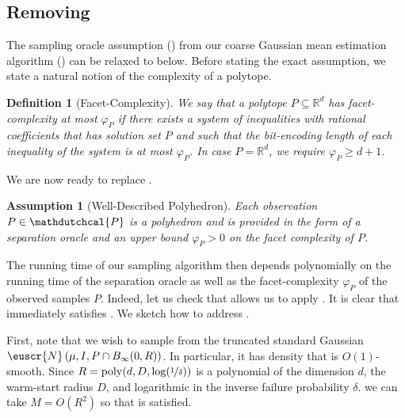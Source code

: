 \documentclass[11pt,letterpaper]{article}
\newcommand{\sset}{\subseteq}
\theoremstyle{plain}
\newtheorem{assumption}{Assumption}
\newtheorem{definition}{Definition}
\theoremstyle{definition}
\theoremstyle{remark}
\newcommand{\inparen}[1]{\ensuremath{\left(#1\right)}}
\newcommand{\R}{\mathbb{R}}
\newcommand{\nfrac}[2]{\nicefrac{#1}{#2}}
\newcommand{\poly}{\mathrm{poly}}
\newcommand{\customcal}[1]{\euscr{#1}}
\newcommand{\cN}{\customcal{N}}
\newcommand{\hypo}[1]{\mathdutchcal{#1}}
\newcommand{\hyP}{\hypo{P}}
\newcommand{\truncatedNormal}[3]{\cN\inparen{#1,#2,#3}}
\begin{document}
{{{    \subsection{Removing \texorpdfstring{}{Assumption}} \label{apx:sampling-polytopes:removing-oracle-assumption}
    The sampling oracle assumption () from our coarse Gaussian mean estimation algorithm () can be relaxed to  below.
    Before stating the exact assumption,
    we state a natural notion of the complexity of a polytope.
    \begin{definition}[Facet-Complexity]
        We say that a polytope $P\sset \R^d$ has \emph{facet-complexity} at most $\varphi_P$
        if there exists a system of inequalities with rational coefficients that has solution set $P$ and such that the bit-encoding length of each inequality of the system is at most $\varphi_P$.
        In case $P=\R^d$,
        we require $\varphi_P\geq d+1$.
    \end{definition}
    We are now ready to replace .
    \begin{assumption}[Well-Described Polyhedron]\label{asmp:wellDescribedPolyhedron}
        Each observation $P\in \hyP$ is a polyhedron and is provided in the form of a separation oracle and an upper bound $\varphi_P > 0$
        on the facet complexity of $P$.
    \end{assumption}
    The running time of our sampling algorithm then depends polynomially on the running time of the separation oracle
    as well as the facet-complexity $\varphi_P$ of the observed samples $P$.
    Indeed, let us check that  allows us to apply .
    It is clear that  immediately satisfies .
    We sketch how to address .

    {First,
    note that we wish to sample from the truncated standard Gaussian $\truncatedNormal{\mu}{I}{P\cap B_\infty(0, R)}$.
    In particular,
    it has density that is $O(1)$-smooth.
    Since $R = \poly(d, D, \log(\nfrac1\delta))$ is a polynomial of the dimension $d$,
    the warm-start radius $D$,
    and logarithmic in the inverse failure probability $\delta$.
    we can take $M = {O(R^2)}$ so that  is satisfied.

}}}}
\end{document}
